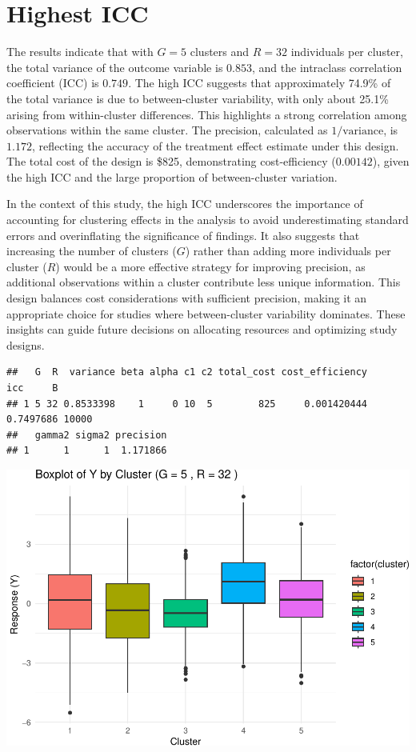 \documentclass[
]{article}
\begin{document}
\hypertarget{highest-icc}{%
\section{Highest ICC}\label{highest-icc}}

The results indicate that with \(G = 5\) clusters and \(R = 32\)
individuals per cluster, the total variance of the outcome variable is
\(0.853\), and the intraclass correlation coefficient (ICC) is
\(0.749\). The high ICC suggests that approximately 74.9\% of the total
variance is due to between-cluster variability, with only about 25.1\%
arising from within-cluster differences. This highlights a strong
correlation among observations within the same cluster. The precision,
calculated as \(1/\text{variance}\), is \(1.172\), reflecting the
accuracy of the treatment effect estimate under this design. The total
cost of the design is \$825, demonstrating cost-efficiency
(\(0.00142\)), given the high ICC and the large proportion of
between-cluster variation.

In the context of this study, the high ICC underscores the importance of
accounting for clustering effects in the analysis to avoid
underestimating standard errors and overinflating the significance of
findings. It also suggests that increasing the number of clusters
(\(G\)) rather than adding more individuals per cluster (\(R\)) would be
a more effective strategy for improving precision, as additional
observations within a cluster contribute less unique information. This
design balances cost considerations with sufficient precision, making it
an appropriate choice for studies where between-cluster variability
dominates. These insights can guide future decisions on allocating
resources and optimizing study designs.

\begin{verbatim}
##   G  R  variance beta alpha c1 c2 total_cost cost_efficiency       icc     B
## 1 5 32 0.8533398    1     0 10  5        825     0.001420444 0.7497686 10000
##   gamma2 sigma2 precision
## 1      1      1  1.171866
\end{verbatim}

\begin{center}\includegraphics{Project3Simulation_files/figure-latex/unnamed-chunk-8-1} \end{center}
\end{document}

